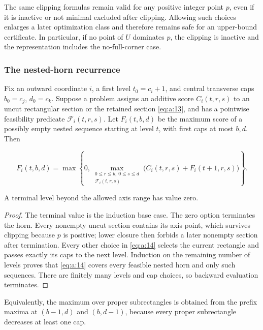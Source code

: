 The same clipping formulas remain valid for any positive integer point
\(p\), even if it is inactive or not minimal excluded after clipping. Allowing
such choices enlarges a later optimization class and therefore remains safe
for an upper-bound certificate. In particular, if no point of \(U\) dominates
\(p\), the clipping is inactive and the representation includes the
no-full-corner case.

\subsubsection{The nested-horn recurrence}

\begin{lemma}\label{lemma:horn-recurrence}

Fix an outward coordinate \(i\), a first level \(t_0=c_i+1\), and central
transverse caps \(b_0=c_j\), \(d_0=c_k\). Suppose a problem assigns an
additive score \(C_i(t,r,s)\) to an uncut rectangular section or the retained
section \eqref{eq:a:13}, and has a pointwise feasibility predicate
\(\mathcal F_i(t,r,s)\). Let
\(F_i(t,b,d)\) be the maximum score of a possibly empty nested sequence
starting at level \(t\), with first caps at most \(b,d\). Then

\begin{equation}
\boxed{
F_i(t,b,d)=\max\left\{
0,
\max_{\substack{0\le r\le b,\ 0\le s\le d\\
                 \mathcal F_i(t,r,s)}}
\bigl(C_i(t,r,s)+F_i(t+1,r,s)\bigr)
\right\}.
}
\label{eq:a:14}
\end{equation}

A terminal level beyond the allowed axis range has value zero.
\end{lemma}
\begin{proof}

The terminal value is the induction base case. The zero option terminates
the horn. Every nonempty uncut section contains its axis
point, which survives clipping because \(p\) is positive; lower closure then
forbids a later nonempty section after termination. Every other choice in
\eqref{eq:a:14} selects the current rectangle and passes exactly its caps to the next
level. Induction on the remaining number of levels proves that \eqref{eq:a:14} covers
every feasible nested horn and only such sequences. There are finitely many
levels and cap choices, so backward evaluation terminates.
\end{proof}

Equivalently, the maximum over proper subrectangles is obtained from the
prefix maxima at \((b-1,d)\) and \((b,d-1)\), because every proper
subrectangle decreases at least one cap.


